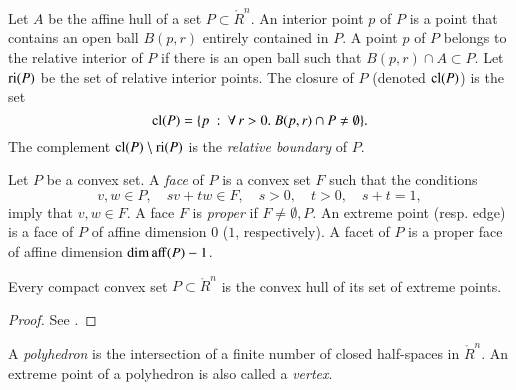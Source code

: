 \begin{definition} Let $A$ be the affine hull of a set $P\subset\ring{R}^n$.    An interior point $p$ of $P$ is a point that contains an open ball $B(p,r)$ entirely contained in $P$.  A point $p$ of $P$ belongs to the relative interior of $P$ if there is an open ball such that $B(p,r) \cap A\subset P$.  Let ${\operatorname{ri}}(P)$ be the set of relative interior points.  The closure of $P$ (denoted ${\operatorname{cl}}(P)$)  is the set
$$
{\operatorname{cl}}(P) = \{p \ :\  \forall\,r >0.~ B(p,r) \cap P \ne \emptyset\}.
$$
The complement ${\operatorname{cl}}(P)\setminus {\operatorname{ri}}(P)$ is the {\it relative boundary} of $P$.
\end{definition}

\begin{definition}
Let $P$ be a convex set.  A {\it face} of $P$ is a convex set $F$ such that the conditions
$$
v,w\in P,\quad s v + t w \in F,\quad s>0,\quad t>0,\quad s+t = 1,
$$ 
imply that $v,w\in F$.  A face $F$ is {\it proper} if $F\ne \emptyset,P$.    An extreme point (resp. edge) is a face of $P$ of affine dimension $0$ ($1$, respectively).   A facet of $P$ is a proper face of affine dimension $\operatorname{dim\,aff}(P)-1$.
\end{definition}


\begin{lemma} Every compact convex set $P\subset\ring{R}^n$ is the convex hull of its set of extreme points.
\end{lemma}

\begin{proof}  See \cite[Theorem~2.6.16]{webster:1994}.
\end{proof}


\begin{definition}  A {\it polyhedron} is the intersection of
a finite number of closed half-spaces in $\ring{R}^n$.  An extreme point of a polyhedron is also called a {\it vertex}.
\end{definition}

